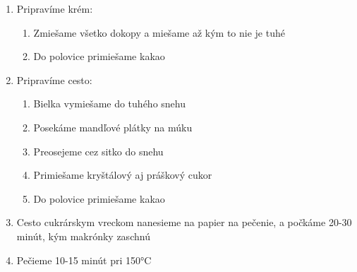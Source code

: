 \begin{recipe}

\begin{enumerate}

\item{Pripravíme krém:}
\begin{enumerate}
\item{Zmiešame všetko dokopy a miešame až kým to nie je tuhé}
\item{Do polovice primiešame kakao}
\end{enumerate}

\item{Pripravíme cesto:}
\begin{enumerate}
\item{Bielka vymiešame do tuhého snehu}
\item{Posekáme mandľové plátky na múku}
\item{Preosejeme cez sitko do snehu}
\item{Primiešame kryštálový aj práškový cukor}
\item{Do polovice primiešame kakao}
\end{enumerate}

\item{Cesto cukrárskym vreckom nanesieme na papier na pečenie, a počkáme 20-30 minút, kým makrónky zaschnú}
\item{Pečieme 10-15 minút pri 150°C}

\end{enumerate}

\end{recipe}

\begin{notes}

\end{notes}	
\clearpage